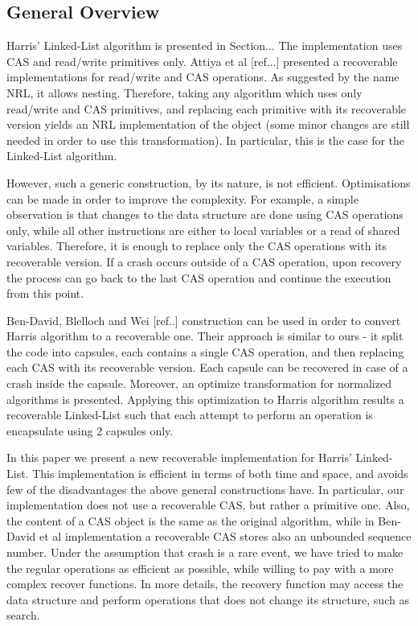 \subsection{General Overview}
Harris' Linked-List algorithm is presented in Section... The implementation uses CAS and read/write primitives only.
Attiya et al [ref...] presented a recoverable implementations for read/write and CAS operations. As suggested by the name NRL, it allows nesting. Therefore, taking any algorithm which uses only read/write and CAS primitives, and replacing each primitive with its recoverable version yields an NRL implementation of the object (some minor changes are still needed in order to use this transformation). In particular, this is the case for the Linked-List algorithm.

However, such a generic construction, by its nature, is not efficient. Optimisations can be made in order to improve the complexity. For example, a simple observation is that changes to the data structure are done using CAS operations only, while all other instructions are either to local variables or a read of shared variables. Therefore, it is enough to replace only the CAS operations with its recoverable version. If a crash occurs outside of a CAS operation, upon recovery the process can go back to the last CAS operation and continue the execution from this point. 

Ben-David, Blelloch and Wei [ref..] construction can be used in order to convert Harris algorithm to a recoverable one. Their approach is similar to ours - it split the code into capsules, each contains a single CAS operation, and then replacing each CAS with its recoverable version. Each capsule can be recovered in case of a crash inside the capsule. Moreover, an optimize transformation for normalized algorithms is presented. Applying this optimization to Harris algorithm results a recoverable Linked-List such that each attempt to perform an operation is encapsulate using 2 capsules only.

In this paper we present a new recoverable implementation for Harris' Linked-List. This implementation is efficient in terms of both time and space, and avoids few of the disadvantages the above general constructions have. In particular, our implementation does not use a recoverable CAS, but rather a primitive one. Also, the content of a CAS object is the same as the original algorithm, while in Ben-David et al implementation a recoverable CAS stores also an unbounded sequence number. Under the assumption that crash is a rare event, we have tried to make the regular operations as efficient as possible, while willing to pay with a more complex recover functions. In more details, the recovery function may access the data structure and perform operations that does not change its structure, such as search.

